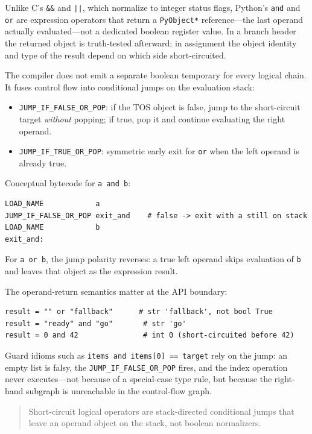 \documentclass[a4paper,twoside]{report}
\begin{document}
Unlike C's \texttt{\&\&} and \texttt{||}, which normalize to integer status flags, Python's \texttt{and} and \texttt{or} are expression operators that return a \texttt{PyObject*} reference---the last operand actually evaluated---not a dedicated boolean register value. In a branch header the returned object is truth-tested afterward; in assignment the object identity and type of the result depend on which side short-circuited.

The compiler does not emit a separate boolean temporary for every logical chain. It fuses control flow into conditional jumps on the evaluation stack:

\begin{itemize}
    \item \texttt{JUMP\_IF\_FALSE\_OR\_POP}: if the TOS object is false, jump to the short-circuit target \emph{without} popping; if true, pop it and continue evaluating the right operand.
    \item \texttt{JUMP\_IF\_TRUE\_OR\_POP}: symmetric early exit for \texttt{or} when the left operand is already true.
\end{itemize}

Conceptual bytecode for \texttt{a and b}:

\begin{verbatim}
LOAD_NAME            a
JUMP_IF_FALSE_OR_POP exit_and    # false -> exit with a still on stack
LOAD_NAME            b
exit_and:
\end{verbatim}

For \texttt{a or b}, the jump polarity reverses: a true left operand skips evaluation of \texttt{b} and leaves that object as the expression result.

The operand-return semantics matter at the API boundary:

\begin{verbatim}
result = "" or "fallback"      # str 'fallback', not bool True
result = "ready" and "go"       # str 'go'
result = 0 and 42               # int 0 (short-circuited before 42)
\end{verbatim}

Guard idioms such as \texttt{items and items[0] == target} rely on the jump: an empty list is falsy, the \texttt{JUMP\_IF\_FALSE\_OR\_POP} fires, and the index operation never executes---not because of a special-case type rule, but because the right-hand subgraph is unreachable in the control-flow graph.

\begin{quote}
Short-circuit logical operators are stack-directed conditional jumps that leave an operand object on the stack, not boolean normalizers.
\end{quote}
\end{document}
